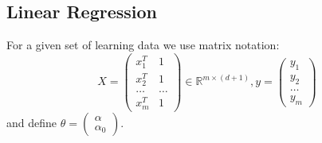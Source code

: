 \subsection*{Linear Regression}
For a given set of learning data we use matrix notation:
$$X =\begin{pmatrix}
    x_1^T & 1\\
    x_2^T & 1\\
    \dots & \dots\\
    x_m^T & 1 
\end{pmatrix} \in \mathbb{R}^{m \times (d+1)}, y = \begin{pmatrix} y_1 \\ y_2\\ \dots \\y_m \end{pmatrix}$$
and define $\theta = \begin{pmatrix} \alpha \\ \alpha_0\end{pmatrix}$.

